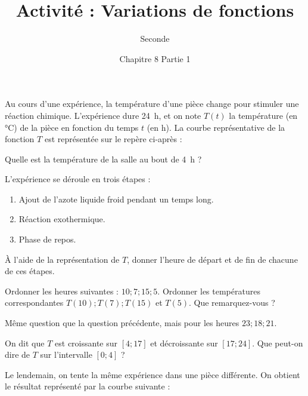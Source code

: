 \documentclass{exos}
\title{Activité : Variations de fonctions}
\date{Chapitre 8 Partie 1}
\author{Seconde}
\begin{document}
\maketitle

Au cours d'une expérience, la température d'une pièce change pour stimuler une réaction chimique. L'expérience dure \qty{24}{\hour}, et on note $T(t)$ la température (en \unit{\celsius}) de la pièce en fonction du temps $t$ (en \unit{\hour}). La courbe représentative de la fonction $T$ est représentée sur le repère ci-après :

\begin{center}
\end{center}
\begin{alphaquestions}
\item Quelle est la température de la salle au bout de \qty{4}{\hour} ?
\item L'expérience se déroule en trois étapes :
\begin{enumerate}
  \item Ajout de l'azote liquide froid pendant un temps long.
  \item Réaction exothermique.
  \item Phase de repos.
\end{enumerate}
À l'aide de la représentation de $T$, donner l'heure de départ et de fin de chacune de ces étapes.
\item Ordonner les heures suivantes : $10; 7; 15; 5$. Ordonner les températures correspondantes $T(10); T(7); T(15)$ et $T(5)$. Que remarquez-vous ?
\item Même question que la question précédente, mais pour les heures $23; 18; 21$.
\item On dit que $T$ est croissante sur $[4;17]$ et décroissante sur $[17;24]$. Que peut-on dire de $T$ sur l'intervalle $[0;4]$ ?
\end{alphaquestions}
\newpage
Le lendemain, on tente la même expérience dans une pièce différente. On obtient le résultat représenté par la courbe suivante :
\end{document}
